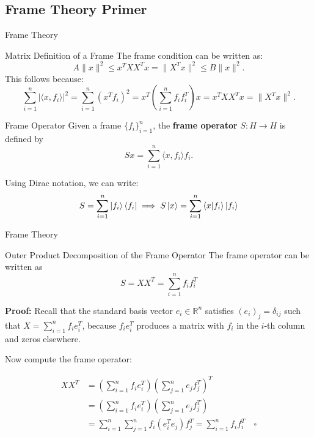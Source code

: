 \documentclass[9pt,dvipsnames]{beamer}
\begin{document}
\subsection{Frame Theory Primer}
\begin{frame}{Frame Theory}

	\begin{block}{Matrix Definition of a Frame}
		The frame condition can be written as:
		\begin{equation*}
			A \|x\|^2 \leq x^T X X^T x  = \|X^T x\|^2 \leq B \|x\|^2.
		\end{equation*}
		This follows because:
		\begin{equation*}
			\sum_{i=1}^n |\langle x, f_i \rangle|^2 = \sum_{i=1}^n (x^T f_i)^2 = x^T \left(\sum_{i=1}^n f_i f_i^T\right) x  =x^T X X^T x = \|X^T x\|^2.
		\end{equation*}
	\end{block}

	\begin{block}{Frame Operator}
		Given a frame $\{f_i\}_{i=1}^n$, the \textbf{frame operator} $S: H \to H$ is defined by
		\begin{equation*}
			Sx = \sum_{i=1}^n \langle x, f_i \rangle f_i.
		\end{equation*}

	\end{block}

	Using Dirac notation, we can write:
	\begin{equation*}
		S = \sum_{i=1}^n \ket{f_i} \bra{f_i} \implies S \ket{x} = \sum_{i=1}^n \braket{x}{f_i} \ket{f_i}
	\end{equation*}

\end{frame}
\begin{frame}{Frame Theory}

	\begin{block}{Outer Product Decomposition of the Frame Operator}
		The frame operator can be written as
		\begin{equation*}
			S = XX^T = \sum_{i=1}^n f_i f_i^T
		\end{equation*}

		\textbf{Proof:}
		Recall that the standard basis vector $e_i \in \mathbb{R}^n$ satisfies $(e_i)_j = \delta_{ij}$ such that $X = \sum_{i=1}^n f_i e_i^T$, because $f_i e_i^T$ produces a matrix with $f_i$ in the $i$-th column and zeros elsewhere.

		Now compute the frame operator:

		\begin{align*}
			XX^T & = \left( \sum_{i=1}^n f_i e_i^T \right) \left( \sum_{j=1}^n e_j f_j^T \right)^T          \\
			     & = \left( \sum_{i=1}^n f_i e_i^T \right) \left( \sum_{j=1}^n e_j f_j^T \right)            \\
			     & = \sum_{i=1}^n \sum_{j=1}^n f_i (e_i^T e_j) f_j^T = \sum_{i=1}^n f_i f_i^T \quad \square
		\end{align*}
	\end{block}
\end{frame}
\end{document}
